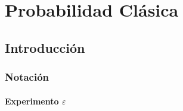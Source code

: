 \documentclass[12pt, fleqn]{report}                             %
\theoremstyle{break}                                            %
\begin{document}
\restoregeometry                                                    %
\nopagecolor                                                        %




\tableofcontents{}
\label{sec:Index}

\clearpage




\part{Probabilidad Clásica}
\clearpage


    \chapter{Introducción}



        \clearpage
        \section{Notación}


            \subsection{Experimento $\varepsilon$}
\end{document}
